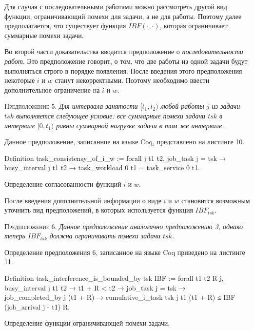 \documentclass[14pt]{matmex-diploma-custom}
\begin{document}
Для случая с последовательными работами можно рассмотреть другой вид функции, ограничивающий 
  помехи для задачи, а не для работы. Поэтому далее предполагается, что существует 
  функция $IBF(\cdot, \cdot)$, которая ограничивает суммарные помехи задачи.

Во второй части доказательства вводится предположение о \textit{последовательности работ}. 
  Это предположение говорит, о том, что две работы из одной задачи будут выполняться строго в порядке появления. 
  После введения этого предположения некоторые $i$ и $w$ станут некорректными. 
  Поэтому необходимо ввести дополнительное ограничение на $i$ и $w$. 

\textsc{Предположение 5.}
\textit{Для интервала занятости $[t_1, t_2)$ любой работы $j$ из задачи $tsk$ выполняется следующее условие: 
  все суммарные помехи задачи $tsk$ в интервале $[0, t_1)$ равны суммарной нагрузке задачи в том же интервале. } 

Данное предположение, записанное на языке Coq, представлено на листинге 10.  

\begin{listing} 
\begin{pyglist}[numbers=none,numbersep=5pt, fontsize=\small]
  Definition task_consistensy_of_i_w :=
    forall j t1 t2,
      job_task j = tsk →
      busy_interval j t1 t2 →
      task_workload 0 t1 = task_service 0 t1.
\end{pyglist}
\caption{Определение согласованности функций $i$ и $w$. }
\label{lst:theorem2}   
\end{listing}  

После введения дополнительной информации о виде $i$ и $w$ становится
  возможным уточнить вид предположений, в которых используется функция $IBF_{tsk}$.

\textsc{Предположение 6.}
\textit{Данное предположение аналогично предположению 3, однако теперь $IBF_{tsk}$ должна 
  ограничивать помехи задачи $tsk$.} 
  
Определение предположения 6, записанное на языке Coq приведено на листинге 11.
  
\begin{listing} 
\begin{pyglist}[numbers=none,numbersep=5pt, fontsize=\small]
  Definition task_interference_is_bounded_by tsk IBF :=
    forall t1 t2 R j,
      busy_interval j t1 t2 →
      t1 + R < t2 →
      job_task j = tsk →
      ~~ job_completed_by j (t1 + R) →
      cumulative_i_task tsk j t1 (t1 + R) 
          ≤ IBF (job_arrival j - t1) R.
\end{pyglist}
\caption{Определение функции ограничивающей помехи задачи. }
\label{lst:theorem2}   
\end{listing}  
\end{document}
